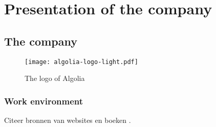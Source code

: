 
\section{Presentation of the company} %
\label{sec:presentation}

\subsection{The company} %
\label{sub:company}

\lipsum[1]

\begin{figure}[H]
  \label{figure:company-logo}
  \centering
  \texttt{[image: algolia-logo-light.pdf]}
  \caption{The logo of Algolia \cite{algolia-press}}
\end{figure}

\subsubsection{Work environment}
\label{sub:work-environment}

Citeer bronnen van websites \cite{voorbeeld-ref} en boeken \cite{boek-ref}.

\lipsum[1]

